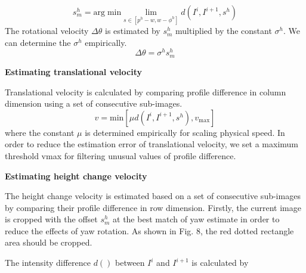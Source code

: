 \begin{equation}
	s_m^h = 
		\text{arg} \; \text{min}
		\lim\limits_{s \in [p^h - w, w-\phi^h]}
		d(I^i, I^{i+1}, s^h)
\end{equation}
The rotational velocity $\Delta\theta$ is estimated by $s_m^h$ multiplied by the constant $\sigma^h$. 
We can determine the $\sigma^h$ empirically.
\begin{equation}
	\Delta \theta = \sigma^h s_m^h
\end{equation}


\textbf{Estimating translational velocity}

Translational velocity is calculated by comparing profile difference in column dimension using a set of consecutive sub-images.
\begin{equation}
	v = \text{min} [ \mu d(I^i, I^{i+1}, s^h), v_{\text{max}} ]
\end{equation}
where the constant $\mu$ is determined empirically for scaling physical speed. 
In order to reduce the estimation error of translational velocity, we set a maximum threshold vmax for filtering unusual values of profile difference.


\textbf{Estimating height change velocity}

The height change velocity is estimated based on a set of consecutive sub-images by comparing their profile difference in row dimension. 
Firstly, the current image is cropped with the offset $s_m^h$ at the best match of yaw estimate in order to reduce the effects of yaw rotation. 
As shown in Fig. 8, the red dotted rectangle area should be cropped.


The intensity difference $d()$ between $I^i$ and $I^{i+1}$ is calculated by





